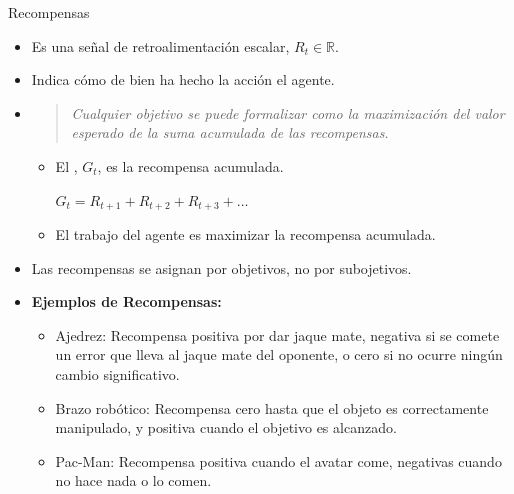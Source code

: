 \documentclass[10pt, envcountsect, handout, aspectratio=1610, hyperref={hypertexnames=true}]{beamer}
\begin{document}
\begin{frame}{Recompensas}
\begin{itemize}
  \item {} Es una señal de retroalimentación escalar, $R_t\in\mathbb{R}$.
  
  \item Indica cómo de bien ha hecho la acción el agente.
  
  
  
  \item {}
  
  \begin{quote}\it
  Cualquier objetivo se puede formalizar como la maximización del valor esperado de la suma acumulada de las recompensas.
  \end{quote}
  
  \begin{itemize}
    \item El , $G_t$, es la recompensa acumulada.
  
 	\hfil $G_t=R_{t+1}+R_{t+2}+R_{t+3}+\ldots$
	 
  \item El trabajo del agente es maximizar la recompensa acumulada.
  \end{itemize}
  

  \item Las recompensas se asignan por objetivos, no por subojetivos.
  
  
  \item \textbf{Ejemplos de Recompensas:}
    \begin{itemize}
      \item Ajedrez: Recompensa positiva por dar jaque mate, negativa si se comete un error que lleva al jaque mate del oponente, o cero si no ocurre ningún cambio significativo.
      \item Brazo robótico: Recompensa cero hasta que el objeto es correctamente manipulado, y positiva cuando el objetivo es alcanzado.
      \item Pac-Man: Recompensa positiva cuando el avatar come, negativas cuando no hace nada o lo comen.
    \end{itemize}
\end{itemize}


\end{frame}




\end{document}
